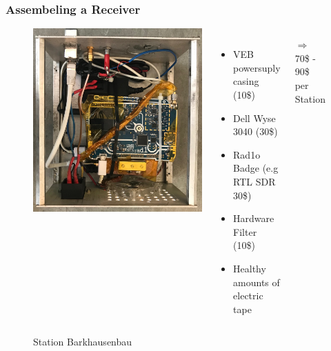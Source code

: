 \documentclass[aspectratio=169]{beamer}
\begin{document}
\begin{frame}
\frametitle{Assembeling a Receiver}

\begin{figure}
\begin{columns}
\begin{center}
\includegraphics[height=0.7\textheight]{figs/station_barkhausen.jpg}
\end{center}
\raggedright
\caption{Station Barkhausenbau}
\vspace{0.5cm}

\begin{itemize}
  \item VEB powersuply casing (10\$)
  \item Dell Wyse 3040 (30\$)
  \item Rad1o Badge (e.g RTL SDR 30\$)
  \item Hardware Filter (10\$)
  \item Healthy amounts of electric tape
\end{itemize}

$\Rightarrow$ 70\$ - 90\$ per Station

\end{columns}
\end{figure}

\end{frame}
\end{document}
